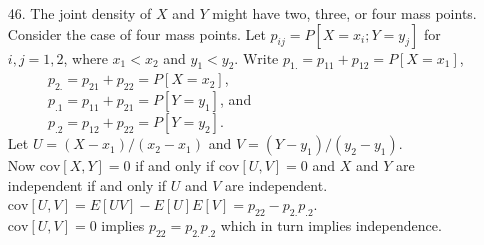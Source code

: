 \begin{enumerate}
	\item[46.] The joint density of $X$ and $Y$ might have two, three, or four mass points. Consider the case of four mass points. Let $p_{ij} = P[X=x_i; Y=y_j]$ for $i,j=1,2$, where $x_1<x_2$ and $y_1<y_2$. \newline
	$\mbox{Write }p_{1.} = p_{11} + p_{12} = P[X=x_1]$, \\
	$\phantom{\mbox{Write }}p_{2.} = p_{21} + p_{22} = P[X=x_2]$, \\
	$\phantom{\mbox{Write }}p_{.1} = p_{11} + p_{21} = P[Y=y_1]$, and \\
	$\phantom{\mbox{Write }}p_{.2} = p_{12} + p_{22} = P[Y=y_2]$. \\
	Let $U = (X-x_1)/(x_2-x_1)$ and $V = (Y-y_1)/(y_2-y_1)$. \\
	Now $\mbox{cov}[X,Y]=0$ if and only if $\mbox{cov}[U,V]=0$ and $X$ and $Y$ are independent if and only if $U$ and $V$ are independent. \\
	$\mbox{cov}[U,V] = E[UV]-E[U]E[V] = p_{22} - p_{2.}p_{.2}$. \\
	$\mbox{cov}[U,V]=0$ implies $p_{22}=p_{2.}p_{.2}$ which in turn implies independence. 
	
\end{enumerate}